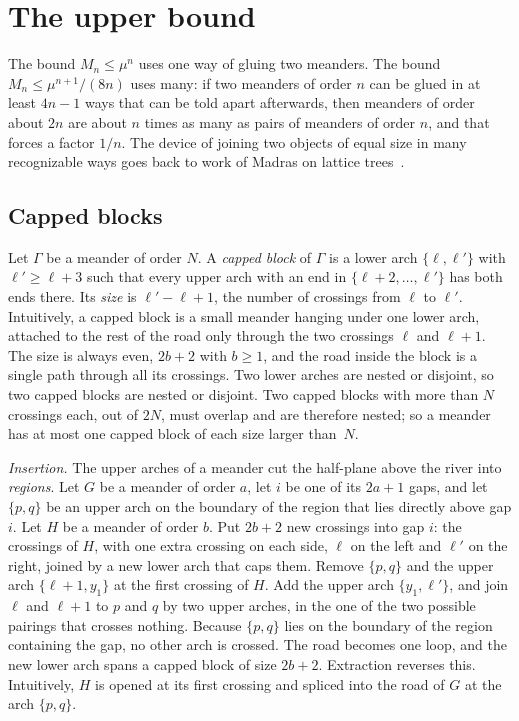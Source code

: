 \section{The upper bound}\label{sec:upper}

The bound $M_n\le\mu^n$ uses one way of gluing two meanders. The bound $M_n\le\mu^{n+1}/(8n)$ uses
many: if two meanders of order $n$ can be glued in at least $4n-1$ ways that can be told apart afterwards,
then meanders of order about $2n$ are about $n$ times as many as pairs of meanders of order $n$,
and that forces a factor $1/n$. The device of joining two objects of equal size in many
recognizable ways goes back to work of Madras on lattice trees~\cite{Madras}.

\subsection{Capped blocks}

Let $\Gamma$ be a meander of order $N$. A \emph{capped block} of $\Gamma$ is a lower arch
$\{\ell,\ell'\}$ with $\ell'\ge\ell+3$ such that every upper arch with an end in
$\{\ell+2,\ldots,\ell'\}$ has both ends there. Its \emph{size} is $\ell'-\ell+1$, the number of
crossings from $\ell$ to $\ell'$. Intuitively, a capped block is a small meander hanging under one
lower arch, attached to the rest of the road only through the two crossings $\ell$ and $\ell+1$. The
size is always even, $2b+2$ with $b\ge1$, and the road inside the block is a single path through all
its crossings. Two lower arches are nested or disjoint, so two capped blocks are nested or disjoint.
Two capped blocks with more than $N$ crossings each, out of $2N$, must overlap and are therefore
nested; so a meander has at most one capped block of each size larger than~$N$.

\emph{Insertion.} The upper arches of a meander cut the half-plane above the river into
\emph{regions}. Let $G$ be a meander of order $a$, let $i$ be one of its $2a+1$ gaps, and let
$\{p,q\}$ be an upper arch on the boundary of the region that lies directly above gap $i$. Let
$H$ be a meander of order $b$. Put $2b+2$ new crossings into gap $i$: the crossings of $H$, with one
extra crossing on each side, $\ell$ on the left and $\ell'$ on the right, joined by a new lower arch
that caps them. Remove $\{p,q\}$ and the upper arch $\{\ell+1,y_1\}$ at the first crossing of $H$.
Add the upper arch $\{y_1,\ell'\}$, and join $\ell$ and $\ell+1$ to $p$ and $q$ by two upper arches, in
the one of the two possible pairings that crosses nothing. Because $\{p,q\}$ lies on the boundary of
the region containing the gap, no other arch is crossed. The road becomes one loop, and the new lower arch spans a capped block
of size $2b+2$. Extraction reverses this. Intuitively, $H$ is opened at its first crossing and spliced
into the road of $G$ at the arch $\{p,q\}$.

